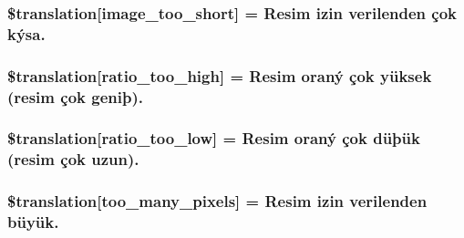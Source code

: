 \subsubsection[{\$translation}]{\setlength{\rightskip}{0pt plus 5cm}\$translation\mbox{[}\textquotesingle{}image\+\_\+too\+\_\+short\textquotesingle{}\mbox{]} = \textquotesingle{}Resim izin verilenden çok kýsa.\textquotesingle{}}\label{class_8upload_8tr___t_r_8php_a86fcd4e1157b00032df451188d735527}
\hypertarget{class_8upload_8tr___t_r_8php_a23396f6ce7f31e5e5f1b57580621d982}{}
\subsubsection[{\$translation}]{\setlength{\rightskip}{0pt plus 5cm}\$translation\mbox{[}\textquotesingle{}ratio\+\_\+too\+\_\+high\textquotesingle{}\mbox{]} = \textquotesingle{}Resim oraný çok yüksek (resim çok geniþ).\textquotesingle{}}\label{class_8upload_8tr___t_r_8php_a23396f6ce7f31e5e5f1b57580621d982}
\hypertarget{class_8upload_8tr___t_r_8php_ac533b9a479f056b0b8623e4268f068c2}{}
\subsubsection[{\$translation}]{\setlength{\rightskip}{0pt plus 5cm}\$translation\mbox{[}\textquotesingle{}ratio\+\_\+too\+\_\+low\textquotesingle{}\mbox{]} = \textquotesingle{}Resim oraný çok düþük (resim çok uzun).\textquotesingle{}}\label{class_8upload_8tr___t_r_8php_ac533b9a479f056b0b8623e4268f068c2}
\hypertarget{class_8upload_8tr___t_r_8php_aa4051ef64e94a3f8295c63cf85544016}{}
\subsubsection[{\$translation}]{\setlength{\rightskip}{0pt plus 5cm}\$translation\mbox{[}\textquotesingle{}too\+\_\+many\+\_\+pixels\textquotesingle{}\mbox{]} = \textquotesingle{}Resim izin verilenden büyük.\textquotesingle{}}\label{class_8upload_8tr___t_r_8php_aa4051ef64e94a3f8295c63cf85544016}
\hypertarget{class_8upload_8tr___t_r_8php_a1fe342c27ce61f4ff4e0120ba647033e}{}
